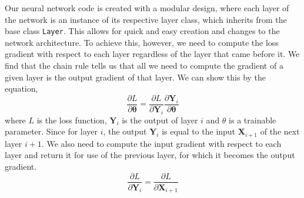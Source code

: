\documentclass[twocolumn,pra,floatfix]{revtex4-2}
\begin{document}
            Our neural network code is created with a modular design, where each layer of the network is an instance of its respective layer class, which inherits from the base class \texttt{Layer}. This allows for quick and easy creation and changes to the network architecture. To achieve this, however, we need to compute the loss gradient with respect to each layer regardless of the layer that came before it. We find that the chain rule tells us that all we need to compute the gradient of a given layer is the output gradient of that layer. We can show this by the equation,
            \begin{equation}
                \frac{\partial L}{\partial \mathbf{\theta}} = \frac{\partial L}{\partial \mathbf{Y}_i} \frac{\partial \mathbf{Y}_i}{\partial \mathbf{\theta}}
            \end{equation}
            where $L$ is the loss function, $\mathbf{Y}_i$ is the output of layer $i$ and $\theta$ is a trainable parameter. Since for layer $i$, the output $\mathbf{Y}_i$ is equal to the input $\mathbf{X}_{i+1}$ of the next layer $i+1$. We also need to compute the input gradient with respect to each layer and return it for use of the previous layer, for which it becomes the output gradient. 
            \begin{equation}
                \frac{\partial L}{\partial \mathbf{Y}_i} = \frac{\partial L}{\partial \mathbf{X}_{i+1}} 
            \end{equation}
\end{document}

